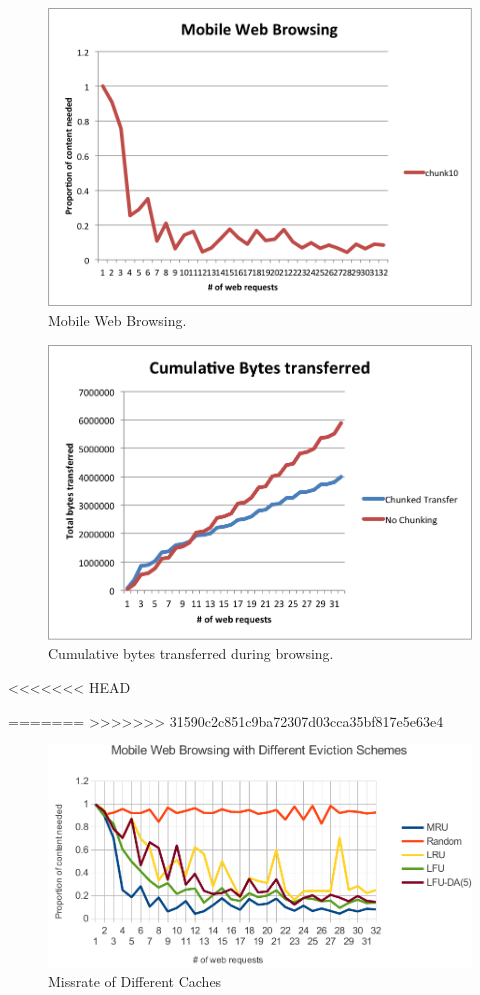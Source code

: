 \begin{figure}[h] 
\centering \includegraphics[width=\columnwidth]{images/browsing.png}
\caption{Mobile Web Browsing. }
\end{figure}
\begin{figure}[h] 
\centering \includegraphics[width=\columnwidth]{images/cumulbrowsing.png}
\caption{Cumulative bytes transferred during browsing. }
\end{figure}
<<<<<<< HEAD

=======
>>>>>>> 31590c2c851c9ba72307d03cca35bf817e5e63e4
\begin{figure}[h]
\centering \includegraphics[width=\columnwidth]{images/caches.pdf}
\caption{Missrate of Different Caches}
\label{fig:cache_missrate}
\end{figure}

